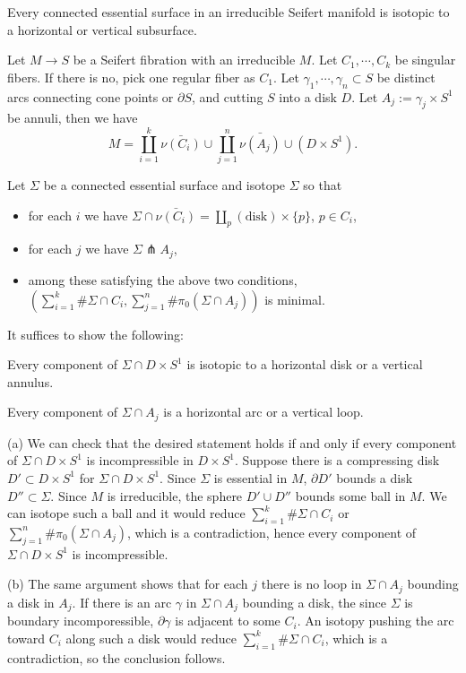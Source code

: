 \documentclass{../../../small}
\begin{document}
\begin{prop}
Every connected essential surface in an irreducible Seifert manifold is isotopic to a horizontal or vertical subsurface.
\end{prop}
\begin{pf}
Let $M\to S$ be a Seifert fibration with an irreducible $M$.
Let $C_1,\cdots,C_k$ be singular fibers.
If there is no, pick one regular fiber as $C_1$.
Let $\gamma_1,\cdots,\gamma_n\subset S$ be distinct arcs connecting cone points or $\partial S$, and cutting $S$ into a disk $D$.
Let $A_j:=\gamma_j\times S^1$ be annuli, then we have
\[M=\coprod_{i=1}^k\bar{\nu(C_i)}\cup\coprod_{j=1}^n\bar{\nu(A_j)}\cup(D\times S^1).\]

Let $\Sigma$ be a connected essential surface and isotope $\Sigma$ so that
\begin{itemize}
\item for each $i$ we have $\Sigma\cap\bar{\nu(C_i)}=\coprod_p(\text{disk})\times\{p\}$, $p\in C_i$,
\item for each $j$ we have $\Sigma\pitchfork A_j$,
\item among these satisfying the above two conditions, $(\sum_{i=1}^k\#\Sigma\cap C_i,\sum_{j=1}^n\#\pi_0(\Sigma\cap A_j))$ is minimal.
\end{itemize}
It suffices to show the following:
\begin{parts}
\item Every component of $\Sigma\cap D\times S^1$ is isotopic to a horizontal disk or a vertical annulus.
\item Every component of $\Sigma\cap A_j$ is a horizontal arc or a vertical loop.
\end{parts}

(a)
We can check that the desired statement holds if and only if every component of $\Sigma\cap D\times S^1$ is incompressible in $D\times S^1$.
Suppose there is a compressing disk $D'\subset D\times S^1$ for $\Sigma\cap D\times S^1$.
Since $\Sigma$ is essential in $M$, $\partial D'$ bounds a disk $D''\subset\Sigma$.
Since $M$ is irreducible, the sphere $D'\cup D''$ bounds some ball in $M$.
We can isotope such a ball and it would reduce $\sum_{i=1}^k\#\Sigma\cap C_i$ or $\sum_{j=1}^n\#\pi_0(\Sigma\cap A_j)$, which is a contradiction, hence every component of $\Sigma\cap D\times S^1$ is incompressible.

(b)
The same argument shows that for each $j$ there is no loop in $\Sigma\cap A_j$ bounding a disk in $A_j$.
If there is an arc $\gamma$ in $\Sigma\cap A_j$ bounding a disk, the since $\Sigma$ is boundary incomporessible, $\partial\gamma$ is adjacent to some $C_i$.
An isotopy pushing the arc toward $C_i$ along such a disk would reduce $\sum_{i=1}^k\#\Sigma\cap C_i$, which is a contradiction, so the conclusion follows.
\end{pf}
\end{document}
